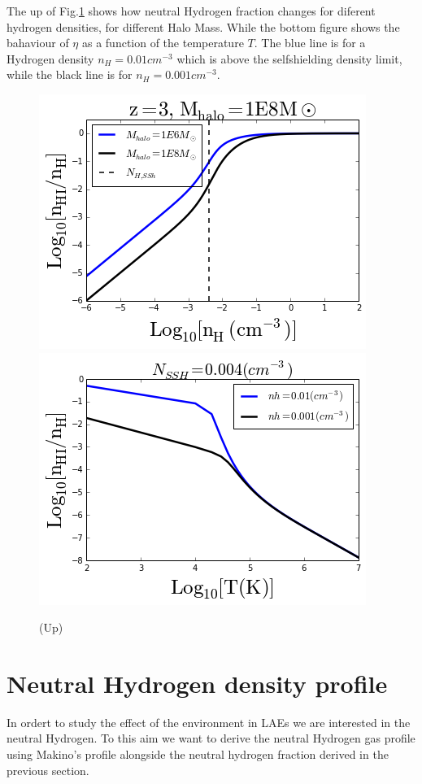 \documentclass[12pt]{article}
\begin{document}
The up of Fig.\ref{fig:eta} shows how neutral Hydrogen fraction changes for diferent hydrogen densities, 
for different Halo Mass.
While the bottom figure shows the bahaviour of $\eta$ as a function of the temperature $T$. The blue 
line is for a Hydrogen density $n_H = 0.01 cm^{-3}$ which is above the selfshielding density limit, 
while the black line is for $n_H  = 0.001 cm^{-3}$.

\begin{figure}[H]\label{fig:eta}
\centering
\includegraphics[scale=0.7]{../figures/etavsnh.png}
\includegraphics[scale=0.7]{../figures/etavsT.png}
\caption{(Up) }
\end{figure}

\section{Neutral Hydrogen density profile}\label{sec:NHI}

In ordert to study the effect of the environment in LAEs we are interested in the neutral Hydrogen. 
To this aim we want to derive the neutral Hydrogen gas profile using Makino's profile alongside 
the neutral hydrogen fraction derived in the previous section. 
\end{document}
